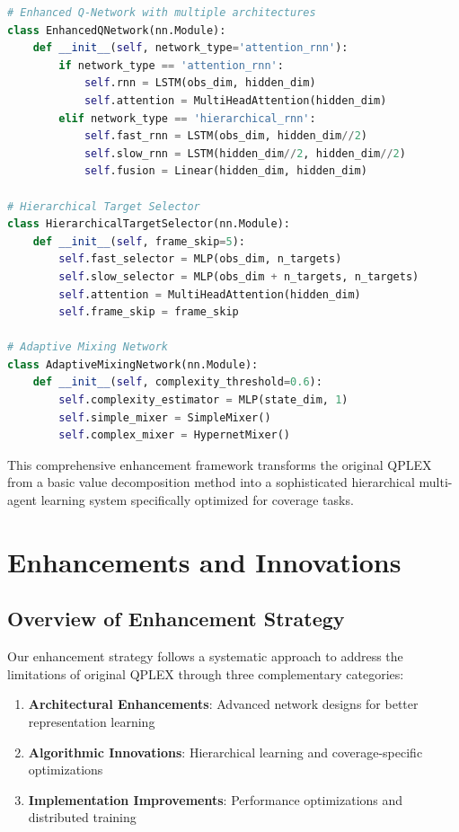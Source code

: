 \documentclass[12pt,a4paper]{report}
\begin{document}
\begin{lstlisting}[language=Python, caption=Enhanced QPLEX Architecture]
# Enhanced Q-Network with multiple architectures
class EnhancedQNetwork(nn.Module):
    def __init__(self, network_type='attention_rnn'):
        if network_type == 'attention_rnn':
            self.rnn = LSTM(obs_dim, hidden_dim)
            self.attention = MultiHeadAttention(hidden_dim)
        elif network_type == 'hierarchical_rnn':
            self.fast_rnn = LSTM(obs_dim, hidden_dim//2)
            self.slow_rnn = LSTM(hidden_dim//2, hidden_dim//2)
            self.fusion = Linear(hidden_dim, hidden_dim)

# Hierarchical Target Selector
class HierarchicalTargetSelector(nn.Module):
    def __init__(self, frame_skip=5):
        self.fast_selector = MLP(obs_dim, n_targets)
        self.slow_selector = MLP(obs_dim + n_targets, n_targets)
        self.attention = MultiHeadAttention(hidden_dim)
        self.frame_skip = frame_skip

# Adaptive Mixing Network
class AdaptiveMixingNetwork(nn.Module):
    def __init__(self, complexity_threshold=0.6):
        self.complexity_estimator = MLP(state_dim, 1)
        self.simple_mixer = SimpleMixer()
        self.complex_mixer = HypernetMixer()
\end{lstlisting}

This comprehensive enhancement framework transforms the original QPLEX from a basic value decomposition method into a sophisticated hierarchical multi-agent learning system specifically optimized for coverage tasks.

\chapter{Enhancements and Innovations}

\section{Overview of Enhancement Strategy}

Our enhancement strategy follows a systematic approach to address the limitations of original QPLEX through three complementary categories:

\begin{enumerate}
\item \textbf{Architectural Enhancements}: Advanced network designs for better representation learning
\item \textbf{Algorithmic Innovations}: Hierarchical learning and coverage-specific optimizations  
\item \textbf{Implementation Improvements}: Performance optimizations and distributed training
\end{enumerate}
\end{document}
